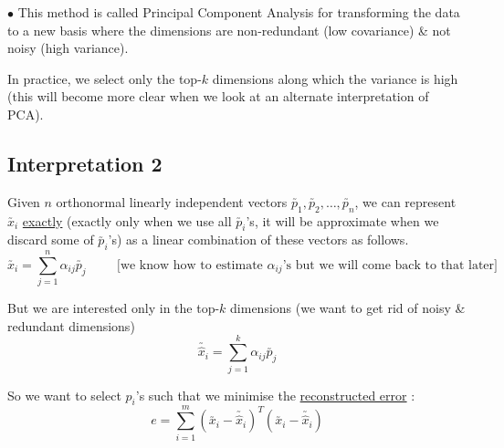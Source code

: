 \documentclass[11pt, a4paper]{article}
\begin{document}
\vspace{0.3cm}

$\bullet$ This method is called Principal Component Analysis for transforming the data to a new basis where the dimensions are non-redundant (low covariance) \& not noisy (high variance). \\

\vspace{0.3cm}

In practice, we select only the top-$k$ dimensions along which the variance is high (this will become more clear when we look at an alternate interpretation of PCA).

\newpage

\subsection{Interpretation 2}

Given $n$ orthonormal linearly independent vectors $\utilde{p_1}, \utilde{p_2}, \ldots, \utilde{p_n}$, we can represent $\utilde{x_i}$ \underline{exactly} (exactly only when we use all $\utilde{p_i}$'s, it will be approximate when we discard some of $\utilde{p_i}$'s) as a linear combination of these vectors as follows.
\[
\utilde{x_i} = \sum_{j=1}^{n} \alpha_{ij} \utilde{p_j} \hspace{1cm}  \text{[we know how to estimate $\alpha_{ij}$'s but we will come back to that later]}
\]

But we are interested only in the top-$k$ dimensions (we want to get rid of noisy \& redundant dimensions)
\[
\utilde{\hat{x}_i} = \sum_{j=1}^{k} \alpha_{ij} \utilde{p_j}
\]

So we want to select $p_i$'s such that we minimise the \underline{reconstructed error} :
\[
e = \sum_{i=1}^{m} (\utilde{x_i} - \utilde{\hat{x}_i})^T (\utilde{x_i} - \utilde{\hat{x}_i})
\]
\end{document}
